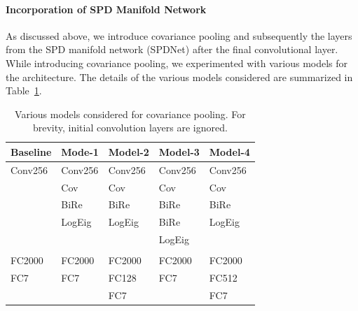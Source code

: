 \documentclass[10pt,twocolumn,letterpaper]{article}
\begin{document}
	\paragraph{Incorporation of SPD Manifold Network}
	As discussed above, we introduce covariance pooling and subsequently the layers from the SPD manifold network (SPDNet) after the final convolutional layer. While introducing covariance pooling, we experimented with various models for the architecture. The details of the various models considered are summarized in Table~\ref{table:architecture_list}.
	\begin{table}[ht]
		\centering
		\begin{tabular}{@{} p{1cm} p{1.1cm} p{1.25cm} p{1.25cm} p{1.25cm} @{}}
			\toprule
			Baseline & Mode-1 & Model-2 & Model-3 & Model-4\\
			\midrule
			Conv256 	& Conv256 	& Conv256 	& Conv256 	& Conv256\\
			\midrule
			 			& Cov 		& Cov 		& Cov		& Cov \\
			& BiRe 		& BiRe 		& BiRe		& BiRe \\
			& LogEig	& LogEig 	& BiRe		& LogEig \\
			&  			&  			& LogEig	& \\
			&  			&  			& 			& \\
			FC2000	& FC2000 	& FC2000	& FC2000	& FC2000\\
			FC7		& FC7 		& FC128 	& FC7		& FC512\\
			&  			& FC7		& 			& FC7\\
			\bottomrule
		\end{tabular}
		\caption{Various models considered for covariance pooling. For brevity, initial convolution layers are ignored.}
		\label{table:architecture_list}
	\end{table}	
\end{document}
